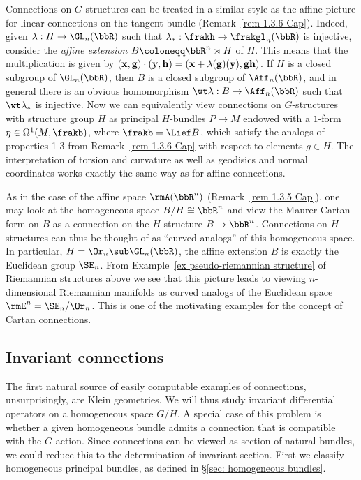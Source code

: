 \begin{example}\label{ex 1.3.6 Cap}
    Connections on $G$-structures can be treated in a similar style as the affine picture for linear connections on the tangent bundle (Remark~\ref{rem 1.3.6 Cap}). Indeed, given $\lambda:H\to \GL_n(\bbR)$ such that $\lambda_\ast:\frakh\to \frakgl_n(\bbR)$ is injective, consider the \emph{affine extension} $B\coloneqq \bbR^n\rtimes H$ of $H$. This means that the multiplication is given by $(\bf{x},g)\cdot (\bf{y},h)=(\bf{x}+\lambda(g)(\bf{y}),gh)$. If $H$ is a closed subgroup of $\GL_n(\bbR)$, then $B$ is a closed subgroup of $\Aff_n(\bbR)$, and in general there is an obvious homomorphism $\wt\lambda:B\to \Aff_n(\bbR)$ such that $\wt\lambda_{\ast}$  is injective. Now we can equivalently view connections on $G$-structures with structure group $H$ as principal $H$-bundles $P\to M$ endowed with a $1$-form $\eta\in\Omega^1(M,\frakb)$, where $\frakb=\Lief B$, which satisfy the analogs of properties 1-3 from Remark~\ref{rem 1.3.6 Cap} with respect to elements $g\in H$. The interpretation of torsion and curvature as well as geodisics and normal coordinates works exactly the same way as for affine connections.

    As in the case of the affine space $\rmA(\bbR^n)$ (Remark~\ref{rem 1.3.5 Cap}), one may look at the homogeneous space $B\slash H\cong\bbR^n$ and view the Maurer-Cartan form on $B$ as a connection on the $H$-structure $B\to\bbR^n$.  Connections on $H$-structures can thus be thought of as ``curved analogs'' of this homogeneous space. In particular, $H=\Or_n\sub \GL_n(\bbR)$, the affine extension $B$ is exactly the Euclidean group $\SE_n$. From Example~\ref{ex pseudo-riemannian structure} of Riemannian structures above we see that this picture leads to viewing $n$-dimensional Riemannian manifolds as curved analogs of the Euclidean space $\rmE^n=\SE_n\slash\Or_n$. This is one of the motivating examples for the concept of Cartan connections.
\end{example}







\subsection{Invariant connections}\label{sec: invariant connections}

The first natural source of easily computable examples of connections, unsurprisingly, are Klein geometries. We will thus study invariant differential operators on a homogeneous space $G\slash H$. A special case of this problem is whether a given homogeneous bundle admits a connection that is compatible with the $G$-action. Since connections can be viewed as section of natural bundles, we could reduce this to the determination of invariant section. First we classify homogeneous principal bundles, as defined in \S\ref{sec: homogeneous bundles}.

